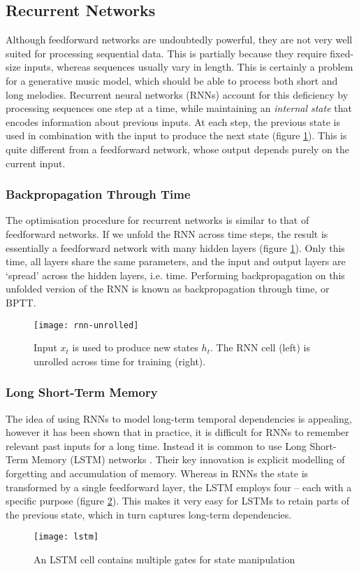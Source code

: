 \documentclass[../../report.tex]{subfiles}
\begin{document}
\subsection{Recurrent Networks}

Although feedforward networks are undoubtedly powerful, they are not very well
suited for processing sequential data. This is partially because they require
fixed-size inputs, whereas sequences usually vary in length. This is certainly a
problem for a generative music model, which should be able to process both short
and long melodies. Recurrent neural networks (RNNs) account for this deficiency
by processing sequences one step at a time, while maintaining an \emph{internal
state} that encodes information about previous inputs. At each step, the
previous state is used in combination with the input to produce the next state
(figure \ref{fig:rnn-unrolled}). This is quite different from a feedforward
network, whose output depends purely on the current input.

\subsubsection{Backpropagation Through Time}
The optimisation procedure for recurrent networks is similar to that of
feedforward networks. If we unfold the RNN across time steps, the result is
essentially a feedforward network with many\footnotemark{} hidden layers (figure
\ref{fig:rnn-unrolled}). Only this time, all layers share the same parameters,
and the input and output layers are `spread' across the hidden layers, i.e.
time. Performing backpropagation on this unfolded version of the RNN is known as
backpropagation through time, or BPTT.


\begin{figure}
  \centering
  \texttt{[image: rnn-unrolled]}
  \caption{Input $x_t$ is used to produce new states $h_t$. The RNN cell (left)
  is unrolled across time for training (right). \cite{Olah2015LSTM}}
  \label{fig:rnn-unrolled}
\end{figure}

\subsubsection{Long Short-Term Memory}
The idea of using RNNs to model long-term temporal dependencies is appealing,
however it has been shown \cite{Bengio1994} that in practice, it is difficult
for RNNs to remember relevant past inputs for a long time. Instead it is common
to use Long Short-Term Memory (LSTM) networks \cite{Hochreiter1997}. Their key
innovation is explicit modelling of forgetting and accumulation of memory.
Whereas in RNNs the state is transformed by a single feedforward layer, the LSTM
employs four -- each with a specific purpose (figure \ref{fig:lstm}). This makes
it very easy for LSTMs to retain parts of the previous state, which in turn
captures long-term dependencies.

\begin{figure}
  \centering
  \texttt{[image: lstm]}
  \caption{An LSTM cell contains multiple gates for state manipulation \cite{Olah2015LSTM}}
  \label{fig:lstm}
\end{figure}
\end{document}
